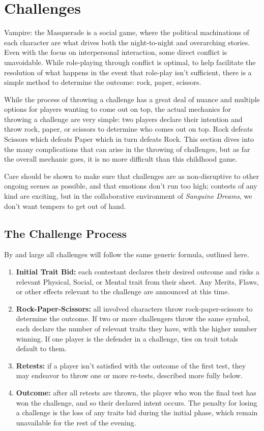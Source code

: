 \section{Challenges}
\label{sec:challenges}
Vampire: the Masquerade is a social game, where the political machinations of each character are 
what drives both the night-to-night and overarching stories.  Even with the focus on interpersonal 
interaction, some direct conflict is unavoidable.  While role-playing through conflict is optimal, 
to help facilitate the resolution of what happens in the event that role-play isn't sufficient, there 
is a simple method to determine the outcome:  rock, paper, scissors.

While the process of throwing a challenge has a great deal of nuance and multiple options for players 
wanting to come out on top, the actual mechanics for throwing a challenge are very simple:  two players 
declare their intention and throw rock, paper, or scissors to determine who comes out on top.  Rock 
defeats Scissors which defeats Paper which in turn defeats Rock.  This section dives into the many 
complications that can arise in the throwing of challenges, but as far the overall mechanic goes, 
it is no more difficult than this childhood game.

Care should be shown to make sure that challenges are as non-disruptive to other ongoing scenes as 
possible, and that emotions don't run too high; contests of any kind are exciting, but in the collaborative 
environment of \emph{Sanguine Dreams}, we don't want tempers to get out of hand.

\subsection{The Challenge Process}
By and large all challenges will follow the same generic formula, outlined here.  

\begin{enumerate}
	\item \textbf{Initial Trait Bid:} each contestant declares their desired outcome and risks a 
	relevant Physical, Social, or Mental trait from their sheet.  Any Merits, Flaws, or other effects 
	relevant to the challenge are announced at this time.
	\item \textbf{Rock-Paper-Scissors:} all involved characters throw rock-paper-scissors to determine 
	the outcome.  If two or more challengers throw the same symbol, each declare the number of 
	relevant traits they have, with the higher number winning.  If one player is the defender in a 
	challenge, ties on trait totals default to them.
	\item \textbf{Retests:}  if a player isn't satisfied with the outcome of the first test, 
	they may endeavor to throw one or more re-tests, described more fully below.
	\item \textbf{Outcome:}  after all retests are thrown, the player who won the final test 
	has won the challenge, and so their declared intent occurs.  The penalty for losing a challenge 
	is the loss of any traits bid during the initial phase, which remain unavailable for the rest of 
	the evening.
\end{enumerate}


